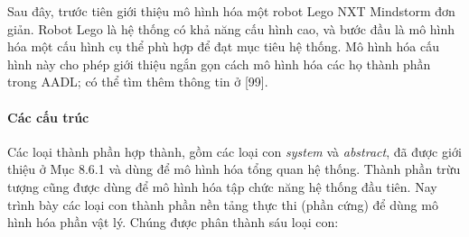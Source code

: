 Sau đây, trước tiên giới thiệu mô hình hóa một robot Lego NXT Mindstorm đơn giản. Robot Lego là hệ thống có khả năng cấu hình cao, và bước đầu là mô hình hóa một cấu hình cụ thể phù hợp để đạt mục tiêu hệ thống. Mô hình hóa cấu hình này cho phép giới thiệu ngắn gọn cách mô hình hóa các họ thành phần trong AADL; có thể tìm thêm thông tin ở [99].

\paragraph{Các cấu trúc}
Các loại thành phần hợp thành, gồm các loại con \emph{system} và \emph{abstract}, đã được giới thiệu ở Mục 8.6.1 và dùng để mô hình hóa tổng quan hệ thống. Thành phần trừu tượng cũng được dùng để mô hình hóa tập chức năng hệ thống đầu tiên. Nay trình bày các loại con thành phần nền tảng thực thi (phần cứng) để dùng mô hình hóa phần vật lý. Chúng được phân thành sáu loại con:
